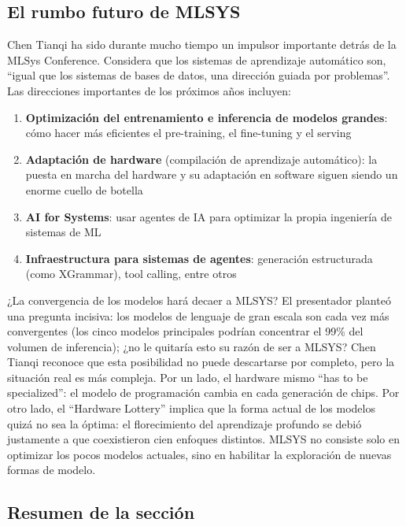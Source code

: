 \subsection{El rumbo futuro de MLSYS}

Chen Tianqi ha sido durante mucho tiempo un impulsor importante detrás de la MLSys Conference. Considera que los sistemas de aprendizaje automático son, ``igual que los sistemas de bases de datos, una dirección guiada por problemas''. Las direcciones importantes de los próximos años incluyen:

\begin{enumerate}
    \item \textbf{Optimización del entrenamiento e inferencia de modelos grandes}: cómo hacer más eficientes el pre-training, el fine-tuning y el serving
    \item \textbf{Adaptación de hardware} (compilación de aprendizaje automático): la puesta en marcha del hardware y su adaptación en software siguen siendo un enorme cuello de botella
    \item \textbf{AI for Systems}: usar agentes de IA para optimizar la propia ingeniería de sistemas de ML
    \item \textbf{Infraestructura para sistemas de agentes}: generación estructurada (como XGrammar), tool calling, entre otros
\end{enumerate}

\begin{knowledgebox}{¿La convergencia de los modelos hará decaer a MLSYS?}
El presentador planteó una pregunta incisiva: los modelos de lenguaje de gran escala son cada vez más convergentes (los cinco modelos principales podrían concentrar el 99\% del volumen de inferencia); ¿no le quitaría esto su razón de ser a MLSYS? Chen Tianqi reconoce que esta posibilidad no puede descartarse por completo, pero la situación real es más compleja. Por un lado, el hardware mismo ``has to be specialized'': el modelo de programación cambia en cada generación de chips. Por otro lado, el ``Hardware Lottery'' implica que la forma actual de los modelos quizá no sea la óptima: el florecimiento del aprendizaje profundo se debió justamente a que coexistieron cien enfoques distintos. MLSYS no consiste solo en optimizar los pocos modelos actuales, sino en habilitar la exploración de nuevas formas de modelo.
\end{knowledgebox}

\subsection{Resumen de la sección}

